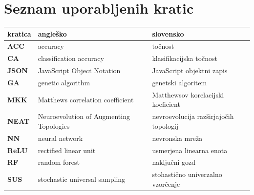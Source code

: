 \documentclass[a4paper,12pt,openright]{book}
\newcommand{\clearemptydoublepage}{\newpage{\pagestyle{empty}\cleardoublepage}}
\begin{document}
    \clearemptydoublepage


    \chapter*{Seznam uporabljenih kratic}

    \noindent\begin{tabular}{p{}|p{}|p{}}    %
                 \textbf{kratica} & \textbf{angleško}                       & \textbf{slovensko}                     \\ \hline
                 \textbf{ACC}     & accuracy                                & točnost                                \\
                 \textbf{CA}      & classification accuracy                 & klasifikacijska točnost                \\
                 \textbf{JSON}    & JavaScript Object Notation              & JavaScript objektni zapis              \\
                 \textbf{GA}      & genetic algorithm                       & genetski algoritem                     \\
                 \textbf{MKK}     & Matthews correlation coefficient        & Matthewsov korelacijski koeficient     \\
                 \textbf{NEAT}    & Neuroevolution of Augmenting Topologies & nevroevolucija razširjajočih topologij \\
                 \textbf{NN}      & neural network                          & nevronska mreža                        \\
                 \textbf{ReLU}    & rectified linear unit                   & usmerjena linearna enota               \\
                 \textbf{RF}      & random forest                           & naključni gozd                         \\
                 \textbf{SUS}     & stochastic universal sampling           & stohastično univerzalno vzorčenje      \\
    \end{tabular}



    \clearemptydoublepage
\end{document}
